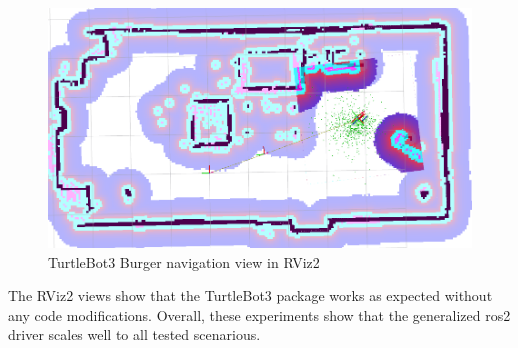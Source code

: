 \begin{figure}[H]
    \centering
    \includegraphics[width=\textwidth]{./results/figures/turtlebot_navigation}
    \caption{TurtleBot3 Burger navigation view in RViz2}
    \label{fig:results:turtlebot_navigation}
\end{figure}

The RViz2 views show that the TurtleBot3 package works as expected without any code modifications.
Overall, these experiments show that the generalized \ac{ros2} driver scales well to all tested scenarious.
